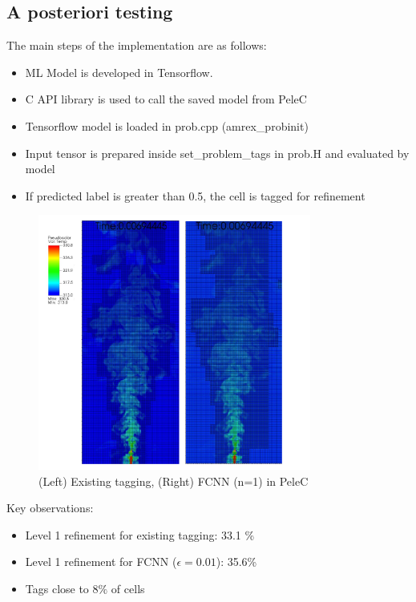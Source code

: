 \documentclass{article}
\begin{document}
\subsection{A posteriori testing}

The main steps of the implementation are as follows:

	\begin{itemize}
		\item ML Model is developed in Tensorflow.
		\item C API library is used to call the saved model from PeleC
		\item Tensorflow model is loaded in prob.cpp (amrex\_probinit)
		\item Input tensor is prepared inside set\_problem\_tags in prob.H and evaluated by model
		\item If predicted label is greater than 0.5, the cell is tagged for refinement
	\end{itemize}
	
\begin{figure}
        \centering
		\includegraphics[width=0.8\textwidth]{figures/lvl1.pdf}
		\caption{ (Left) Existing tagging, (Right) FCNN (n=1) in PeleC}
\end{figure}
Key observations:
	\begin{itemize}
			\item Level 1 refinement for existing tagging: 33.1 \%
			\item Level 1 refinement for FCNN ($\epsilon = 0.01$): 35.6\%
			\item Tags close to $8\%$ of cells
		\end{itemize}
\end{document}
